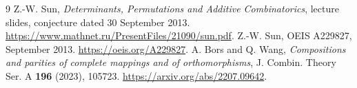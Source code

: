 \documentclass[10pt]{article}
\begin{document}
\begin{thebibliography}{9}
 Z.-W. Sun, \emph{Determinants, Permutations and Additive Combinatorics}, lecture slides, conjecture dated 30 September 2013. \url{https://www.mathnet.ru/PresentFiles/21090/sun.pdf}.
 Z.-W. Sun, OEIS A229827, September 2013. \url{https://oeis.org/A229827}.
 A. Bors and Q. Wang, \emph{Compositions and parities of complete mappings and of orthomorphisms}, J. Combin. Theory Ser. A \textbf{196} (2023), 105723. \url{https://arxiv.org/abs/2207.09642}.
\end{thebibliography}
\end{document}
